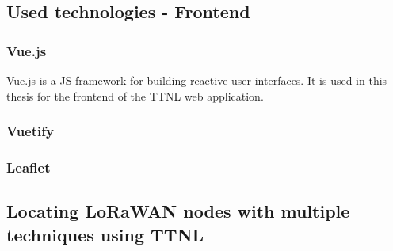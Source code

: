 \subsection{Used technologies - Frontend}

\subsubsection{Vue.js}

Vue.js is a \ac{JS} framework for building reactive user interfaces.
It is used in this thesis for the frontend of the \ac{TTNL} web application.

\subsubsection{Vuetify}

\subsubsection{Leaflet}

\subsection{Locating \ac{LoRaWAN} nodes with multiple techniques using \ac{TTNL}}